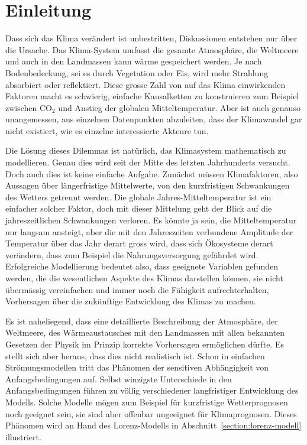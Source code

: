 %
%
%
\chapter*{Einleitung\label{chapter:einleitung}}
Dass sich das Klima verändert ist unbestritten,
Diskussionen entstehen nur über die Ursache.
Das Klima-System umfasst die gesamte Atmosphäre, die Weltmeere und auch in
den Landmassen kann wärme gespeichert werden.
Je nach Bodenbedeckung, sei es durch Vegetation oder Eis, wird mehr
Strahlung absorbiert oder reflektiert.
Diese grosse Zahl von auf das Klima einwirkenden Faktoren macht es
schwierig, einfache Kausalketten zu konstruieren zum Beispiel zwischen
$\text{CO}_2$ und Anstieg der globalen Mitteltemperatur.
Aber ist auch genauso unangemessen, aus einzelnen Datenpunkten 
abzuleiten, dass der Klimawandel gar nicht existiert, wie es einzelne
interessierte Akteure tun.

Die Lösung dieses Dilemmas ist natürlich, das Klimasystem mathematisch
zu modellieren.
Genau dies wird seit der Mitte des letzten Jahrhunderts versucht.
Doch auch dies ist keine einfache Aufgabe.
Zunächst müssen Klimafaktoren, also Aussagen über längerfristige
Mittelwerte, von den kurzfristigen Schwankungen des Wetters getrennt werden.
Die globale Jahres-Mitteltemperatur ist ein einfacher solcher Faktor,
doch mit dieser Mittelung geht der Blick auf die jahreszeitlichen
Schwankungen verloren. 
Es könnte ja sein, die Mitteltemperatur nur langsam ansteigt, aber die
mit den Jahreszeiten verbundene Amplitude der Temperatur über das Jahr
derart gross wird, dass sich Ökosysteme derart verändern, dass zum
Beispiel die Nahrungsversorgung gefährdet wird.
Erfolgreiche Modellierung bedeutet also, dass geeignete Variablen 
gefunden werden, die die wesentlichen Aspekte des Klimas darstellen
können, sie nicht übermässig vereinfachen und immer noch die Fähigkeit
aufrechterhalten, Vorhersagen über die zukünftige Entwicklung des Klimas 
zu machen.

Es ist naheliegend, dass eine detaillierte Beschreibung der Atmosphäre,
der Weltmeere, des Wärmeaustausches mit den Landmassen mit allen bekannten
Gesetzen der Physik im Prinzip korrekte Vorhersagen ermöglichen dürfte.
Es stellt sich aber heraus, dass dies nicht realistisch ist.
Schon in einfachen Strömungsmodellen tritt das Phänomen der sensitiven
Abhängigkeit von Anfangsbedingungen auf.
Selbst winzigste Unterschiede in den Anfangsbedingungen führen zu völlig
verschiedener langfristiger Entwicklung des Modells.
Solche Modelle mögen zum Beispiel für kurzfristige Wetterprognosen
noch geeignet sein, sie sind aber offenbar ungeeignet für Klimaprognosen.
Dieses Phänomen wird an Hand des Lorenz-Modells in
Abschnitt~\ref{section:lorenz-modell} illustriert.


